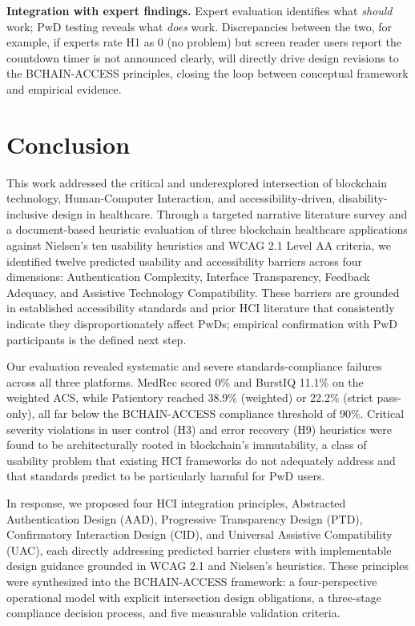 \documentclass[journal,onecolumn]{IEEEtran}
\begin{document}
\textbf{Integration with expert findings.} Expert evaluation identifies what \emph{should} work; PwD testing reveals what \emph{does} work. Discrepancies between the two, for example, if experts rate H1 as 0 (no problem) but screen reader users report the countdown timer is not announced clearly, will directly drive design revisions to the BCHAIN-ACCESS principles, closing the loop between conceptual framework and empirical evidence.

\section{Conclusion}
\label{sec:conclusion}

This work addressed the critical and underexplored intersection of blockchain technology, Human-Computer Interaction, and accessibility-driven, disability-inclusive design in healthcare. Through a targeted narrative literature survey and a document-based heuristic evaluation of three blockchain healthcare applications against Nielsen's ten usability heuristics and WCAG 2.1 Level AA criteria, we identified twelve predicted usability and accessibility barriers across four dimensions: Authentication Complexity, Interface Transparency, Feedback Adequacy, and Assistive Technology Compatibility. These barriers are grounded in established accessibility standards and prior HCI literature that consistently indicate they disproportionately affect PwDs; empirical confirmation with PwD participants is the defined next step.

Our evaluation revealed systematic and severe standards-compliance failures across all three platforms. MedRec scored 0\% and BurstIQ 11.1\% on the weighted ACS, while Patientory reached 38.9\% (weighted) or 22.2\% (strict pass-only), all far below the BCHAIN-ACCESS compliance threshold of 90\%. Critical severity violations in user control (H3) and error recovery (H9) heuristics were found to be architecturally rooted in blockchain's immutability, a class of usability problem that existing HCI frameworks do not adequately address and that standards predict to be particularly harmful for PwD users.

In response, we proposed four HCI integration principles, Abstracted Authentication Design (AAD), Progressive Transparency Design (PTD), Confirmatory Interaction Design (CID), and Universal Assistive Compatibility (UAC), each directly addressing predicted barrier clusters with implementable design guidance grounded in WCAG 2.1 and Nielsen's heuristics. These principles were synthesized into the BCHAIN-ACCESS framework: a four-perspective operational model with explicit intersection design obligations, a three-stage compliance decision process, and five measurable validation criteria.
\end{document}
